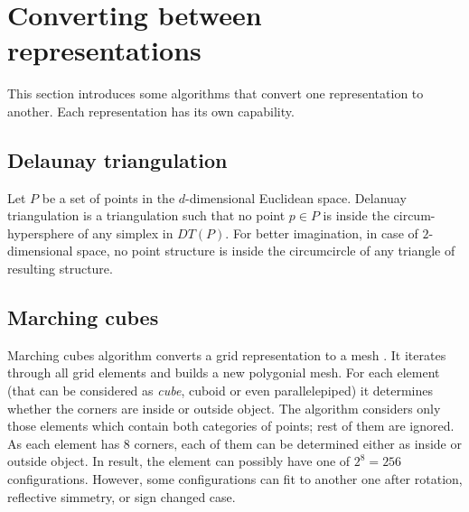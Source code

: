 \section{Converting between representations}

This section introduces some algorithms that convert one representation to another. Each 
representation has its own capability.

\subsection{Delaunay triangulation}

Let $P$ be a set of points in the $d$-dimensional Euclidean space.
Delanuay triangulation\cite{Chew1989} is a triangulation such that
no point $p \in P$ is inside the circum-hypersphere
of any simplex in $DT(P)$. For better imagination, in case of $2$-dimensional space, no point
structure is inside the circumcircle of any triangle of resulting structure.

\subsection{Marching cubes}
\label{sub:march}

Marching cubes algorithm converts a grid representation to a mesh \cite{Lorensen1987}. It iterates through
all grid elements and builds a new polygonial mesh. For each element (that can be considered as
\emph{cube}, cuboid or even parallelepiped)
it determines whether the corners are inside or outside object. The algorithm considers only those elements
which contain both categories of points; rest of them are ignored. As each element has 8 corners,
each of them can be determined either as inside or outside object. In result, the element can possibly
have one of $2^8 = 256$ configurations. However, some configurations can fit to another one after rotation,
reflective simmetry, or sign changed case.\\



